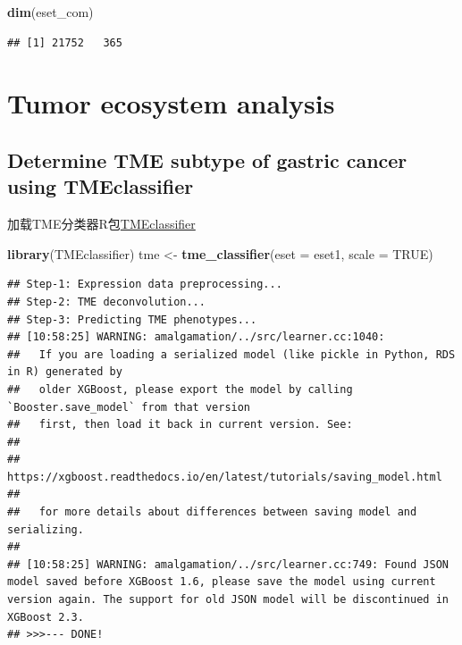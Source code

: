 \documentclass[
  12pt,
]{book}
\newenvironment{Shaded}{\begin{snugshade}}{\end{snugshade}}
\newcommand{\AttributeTok}[1]{\textcolor[rgb]{0.13,0.29,0.53}{#1}}
\newcommand{\ConstantTok}[1]{\textcolor[rgb]{0.56,0.35,0.01}{#1}}
\newcommand{\FunctionTok}[1]{\textcolor[rgb]{0.13,0.29,0.53}{\textbf{#1}}}
\newcommand{\NormalTok}[1]{#1}
\newcommand{\OtherTok}[1]{\textcolor[rgb]{0.56,0.35,0.01}{#1}}
\theoremstyle{definition}
\theoremstyle{definition}
\theoremstyle{definition}
\theoremstyle{definition}
\theoremstyle{remark}
\begin{document}
\begin{Shaded}
\begin{Highlighting}[]
\FunctionTok{dim}\NormalTok{(eset\_com)}
\end{Highlighting}
\end{Shaded}

\begin{verbatim}
## [1] 21752   365
\end{verbatim}

\hypertarget{tumor-ecosystem-analysis}{%
\chapter{Tumor ecosystem analysis}\label{tumor-ecosystem-analysis}}

\hypertarget{determine-tme-subtype-of-gastric-cancer-using-tmeclassifier}{%
\section{Determine TME subtype of gastric cancer using TMEclassifier}\label{determine-tme-subtype-of-gastric-cancer-using-tmeclassifier}}

加载TME分类器R包\href{https://github.com/LiaoWJLab/TMEclassifier}{TMEclassifier}

\begin{Shaded}
\begin{Highlighting}[]
\FunctionTok{library}\NormalTok{(TMEclassifier)}
\NormalTok{tme }\OtherTok{\textless{}{-}} \FunctionTok{tme\_classifier}\NormalTok{(}\AttributeTok{eset =}\NormalTok{ eset1, }\AttributeTok{scale =} \ConstantTok{TRUE}\NormalTok{)}
\end{Highlighting}
\end{Shaded}

\begin{verbatim}
## Step-1: Expression data preprocessing...
## Step-2: TME deconvolution...
## Step-3: Predicting TME phenotypes...
## [10:58:25] WARNING: amalgamation/../src/learner.cc:1040: 
##   If you are loading a serialized model (like pickle in Python, RDS in R) generated by
##   older XGBoost, please export the model by calling `Booster.save_model` from that version
##   first, then load it back in current version. See:
## 
##     https://xgboost.readthedocs.io/en/latest/tutorials/saving_model.html
## 
##   for more details about differences between saving model and serializing.
## 
## [10:58:25] WARNING: amalgamation/../src/learner.cc:749: Found JSON model saved before XGBoost 1.6, please save the model using current version again. The support for old JSON model will be discontinued in XGBoost 2.3.
## >>>--- DONE!
\end{verbatim}
\end{document}
